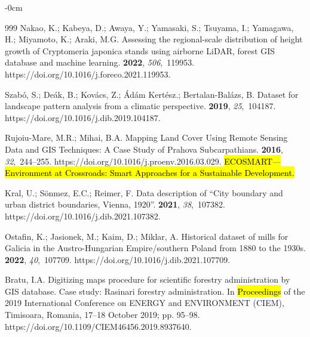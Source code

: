 \documentclass[data,article,accept,pdftex,moreauthors]{Definitions/mdpi}
\begin{document}
{\begin{adjustwidth}{-\extralength}{0cm}
\begin{thebibliography}{999}
Nakao, K.; Kabeya, D.; Awaya, Y.; Yamasaki, S.; Tsuyama, I.; Yamagawa, H.;
 Miyamoto, K.; Araki, M.G.
\newblock Assessing the regional-scale distribution of height growth of
 Cryptomeria japonica stands using airborne LiDAR, forest GIS database and
 machine learning.
 {\bf 2022}, {\em 506},~119953.
https://doi.org/10.1016/j.foreco.2021.119953.

Szabó, S.; Deák, B.; Kovács, Z.; Ádám Kertész.; Bertalan-Balázs, B.
\newblock Dataset for landscape pattern analysis from a climatic perspective.
 {\bf 2019}, {\em 25},~104187.
https://doi.org/10.1016/j.dib.2019.104187.

Rujoiu-Mare, M.R.; Mihai, B.A.
\newblock Mapping Land Cover Using Remote Sensing Data and GIS Techniques: A
 Case Study of Prahova Subcarpathians.
 {\bf 2016}, {\em 32},~244--255. https://doi.org/10.1016/j.proenv.2016.03.029. \hl{ECOSMART---Environment at Crossroads: Smart Approaches for a Sustainable Development.} %


Kral, U.; Sönmez, E.C.; Reimer, F.
\newblock Data description of “City boundary and urban district boundaries,
 Vienna, 1920”.
 {\bf 2021}, {\em 38},~107382.
https://doi.org/10.1016/j.dib.2021.107382.

Ostafin, K.; Jasionek, M.; Kaim, D.; Miklar, A.
\newblock Historical dataset of mills for Galicia in the Austro-Hungarian
 Empire/southern Poland from 1880 to the 1930s.
 {\bf 2022}, {\em 40},~107709.
https://doi.org/10.1016/j.dib.2021.107709.

Bratu, I.A.
\newblock Digitizing maps procedure for scientific forestry administration by
 GIS database. Case study: Rasinari forestry administration.
\newblock In \hl{Proceedings} %
 of the 2019 International Conference on ENERGY and
 ENVIRONMENT (CIEM), Timisoara, Romania, 17--18 October 2019; pp. 95--98.
https://doi.org/10.1109/CIEM46456.2019.8937640.


\end{thebibliography}
\end{adjustwidth}}
\end{document}
